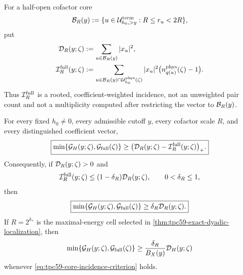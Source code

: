 For a half-open cofactor core
\begin{equation}
 \mathcal B_R(y)
 :=\{u\in\mathcal U_{h_0,>y}^{\rm term}:R\le r_u<2R\},
 \label{eq:tpc59-very-high-core}
\end{equation}
put
\begin{align}
 \mathcal D_R(y;\zeta)
 &:=\sum_{u\in\mathcal B_R(y)}|x_u|^2,
 \label{eq:tpc59-core-terminal-diagonal}\\
 \mathcal I_R^{\rm full}(y;\zeta)
 &:=\sum_{u\in\mathcal B_R(y)\cap\mathcal U_{h_0}^{\rm phys}(\zeta)}
       |x_u|^2\bigl(n_{q(u)}^{\rm phys}(\zeta)-1\bigr).
 \label{eq:tpc59-core-full-incidence}
\end{align}
Thus \(\mathcal I_R^{\rm full}\) is a rooted, coefficient-weighted incidence,
not an unweighted pair count and not a multiplicity computed after
restricting the vector to \(\mathcal B_R(y)\).

\begin{theorem}
\label{thm:tpc59-core-full-singleton-bridge}
For every fixed \(h_0\ne0\), every admissible cutoff \(y\), every cofactor
scale \(R\), and every distinguished coefficient vector,
\begin{equation}
 \boxed{
 \min\{\mathcal G_H(y;\zeta),\mathcal G_{\rm full}(\zeta)\}
 \ge
 \bigl(\mathcal D_R(y;\zeta)-\mathcal I_R^{\rm full}(y;\zeta)\bigr)_+.}
 \label{eq:tpc59-core-full-singleton-floor}
\end{equation}
Consequently, if \(\mathcal D_R(y;\zeta)>0\) and
\begin{equation}
 \mathcal I_R^{\rm full}(y;\zeta)
 \le(1-\delta_R)\mathcal D_R(y;\zeta),
 \qquad 0<\delta_R\le1,
 \label{eq:tpc59-core-incidence-criterion}
\end{equation}
then
\begin{equation}
 \boxed{
 \min\{\mathcal G_H(y;\zeta),\mathcal G_{\rm full}(\zeta)\}
 \ge\delta_R\mathcal D_R(y;\zeta).}
 \label{eq:tpc59-core-positive-full-output}
\end{equation}
If \(R=2^{k_*}\) is the maximal-energy cell selected in
\cref{thm:tpc59-exact-dyadic-localization}, then
\begin{equation}
 \min\{\mathcal G_H(y;\zeta),\mathcal G_{\rm full}(\zeta)\}
 \ge\frac{\delta_R}{B_X(y)}\mathcal D_H(y;\zeta)
 \label{eq:tpc59-selected-block-singleton-transfer}
\end{equation}
whenever \eqref{eq:tpc59-core-incidence-criterion} holds.
\end{theorem}

